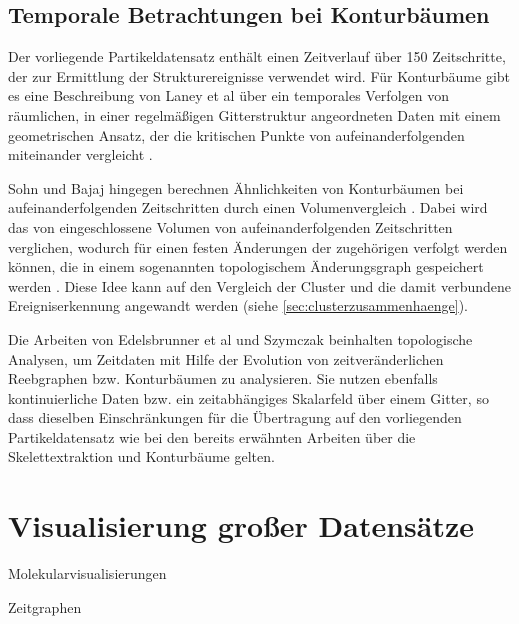 \subsection*{Temporale Betrachtungen bei Konturbäumen}\label{sec:related:konturbaumTemporal}
Der vorliegende Partikeldatensatz enthält einen Zeitverlauf über 150 Zeitschritte, der zur Ermittlung der Strukturereignisse verwendet wird. Für Konturbäume gibt es eine Beschreibung von Laney et al über ein temporales Verfolgen von räumlichen, in einer regelmäßigen Gitterstruktur angeordneten Daten mit einem geometrischen Ansatz, der die kritischen Punkte von aufeinanderfolgenden  miteinander vergleicht \cite[S.~1056]{laney2006turbulentMixingLayer}.

Sohn und Bajaj hingegen berechnen Ähnlichkeiten von Konturbäumen bei aufeinanderfolgenden Zeitschritten durch einen Volumenvergleich \cite{silver1997trackingTurbulent3DFeatures}. Dabei wird das von  eingeschlossene Volumen von aufeinanderfolgenden Zeitschritten verglichen, wodurch für einen festen  Änderungen der zugehörigen  verfolgt werden können, die in einem sogenannten topologischem Änderungsgraph gespeichert werden \cite{sohn2006timeVaryingContourTopology}. Diese Idee kann auf den Vergleich der Cluster und die damit verbundene Ereigniserkennung angewandt werden (siehe \autoref{sec:clusterzusammenhaenge}).

Die Arbeiten von Edelsbrunner et al \cite{edelsbrunner2004timeVaryingReebGraphs} und Szymczak \cite{szymczak2005contourEvolutionInTimeDependentScalarFields} beinhalten topologische Analysen, um Zeitdaten mit Hilfe der Evolution von zeitveränderlichen Reebgraphen bzw. Konturbäumen zu analysieren. Sie nutzen ebenfalls kontinuierliche Daten bzw. ein zeitabhängiges Skalarfeld über einem Gitter, so dass dieselben Einschränkungen für die Übertragung auf den vorliegenden Partikeldatensatz wie bei den bereits erwähnten Arbeiten über die Skelettextraktion und Konturbäume gelten.

\section{Visualisierung großer Datensätze}


Molekularvisualisierungen

Zeitgraphen

